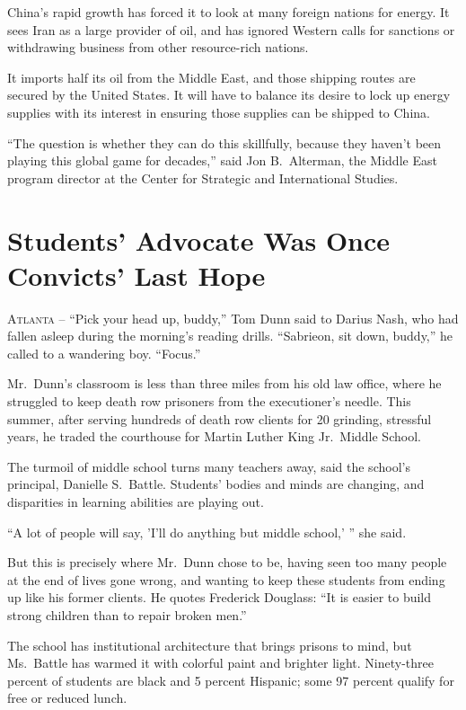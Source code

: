 ﻿\documentclass[12pt]{article}
\begin{document}
China's rapid growth has forced it to look at many foreign nations for energy. It sees Iran as a
large provider of oil, and has ignored Western calls for sanctions or withdrawing business from
other resource-rich nations.

It imports half its oil from the Middle East, and those shipping routes are secured by the United
States. It will have to balance its desire to lock up energy supplies with its interest in ensuring
those supplies can be shipped to China.

``The question is whether they can do this skillfully, because they haven't been playing this global
game for decades,'' said Jon B.~Alterman, the Middle East program director at the Center for
Strategic and International Studies.

\section{Students' Advocate Was Once Convicts' Last Hope}

\lettrine{A}{tlanta} -- ``Pick your head up, buddy,'' Tom Dunn said to
Darius Nash, who had fallen asleep during the morning's reading drills. ``Sabrieon, sit down,
buddy,'' he called to a wandering boy. ``Focus.''

Mr.~Dunn's classroom is less than three miles from his old law office, where he struggled to keep
death row prisoners from the executioner's needle. This summer, after serving hundreds of death row
clients for 20 grinding, stressful years, he traded the courthouse for Martin Luther King Jr.~Middle
School.

The turmoil of middle school turns many teachers away, said the school's principal, Danielle
S.~Battle. Students' bodies and minds are changing, and disparities in learning abilities are
playing out.

``A lot of people will say, 'I'll do anything but middle school,' '' she said.

But this is precisely where Mr.~Dunn chose to be, having seen too many people at the end of lives
gone wrong, and wanting to keep these students from ending up like his former clients. He quotes
Frederick Douglass: ``It is easier to build strong children than to repair broken men.''

The school has institutional architecture that brings prisons to mind, but Ms.~Battle has warmed it
with colorful paint and brighter light. Ninety-three percent of students are black and 5 percent
Hispanic; some 97 percent qualify for free or reduced lunch.
\end{document}
